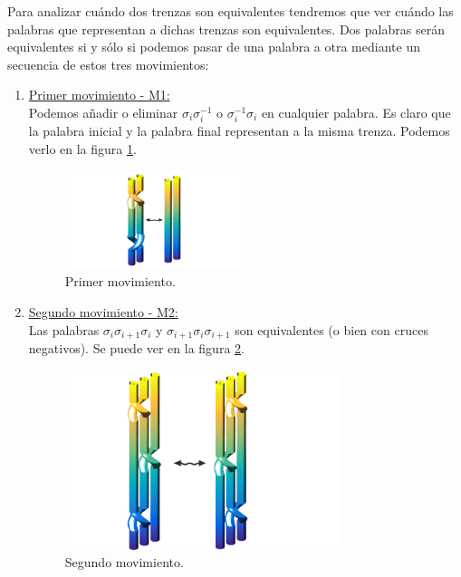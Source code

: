 	Para analizar cuándo dos trenzas son equivalentes tendremos que ver cuándo las palabras que representan a dichas trenzas son equivalentes. Dos palabras serán equivalentes si y sólo si podemos pasar de una palabra a otra mediante un secuencia de estos tres movimientos:
	\begin{enumerate}
		\item \underline{Primer movimiento - M1:} \\
		Podemos añadir o eliminar $\sigma_{i}\sigma_{i}^{-1}$ o $\sigma_{i}^{-1}\sigma_{i}$ en cualquier palabra. Es claro que la palabra inicial y la palabra final representan a la misma trenza. Podemos verlo en la figura \ref{tren6}.
		\begin{figure}[h!]
			\centering
			\includegraphics[width=5.1cm]{itrenzas/M1.png}
			\caption{Primer movimiento.}
			\label{tren6} 
		\end{figure}
		
		\item \underline{Segundo movimiento - M2:} \\
		Las palabras $\sigma_{i} \sigma_{i+1} \sigma_{i}$ y $\sigma_{i+1} \sigma_{i} \sigma_{i+1}$ son equivalentes (o bien con cruces negativos). Se puede ver en la figura \ref{tren7}.
		\begin{figure}[h!]
			\centering
			\includegraphics[width=8cm]{itrenzas/M2.png}
			\caption{Segundo movimiento.}
			\label{tren7} 
		\end{figure}
		

\end{enumerate}
